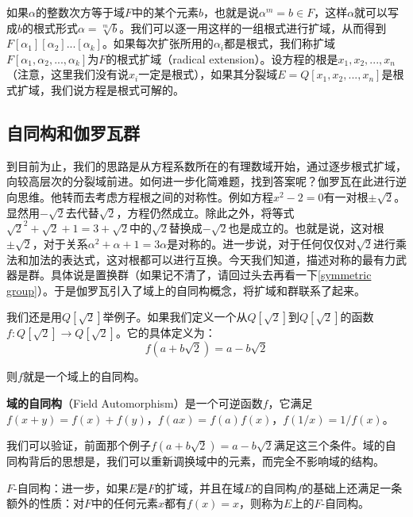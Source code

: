 \documentclass{article}
\begin{document}
如果$\alpha$的整数次方等于域$F$中的某个元素$b$，也就是说$\alpha^m = b \in F$，这样$\alpha$就可以写成$b$的根式形式$\alpha = \sqrt[m]{b}$。我们可以逐一用这样的一组根式进行扩域，从而得到$F[\alpha_1][\alpha_2]...[\alpha_k]$。如果每次扩张所用的$\alpha_i$都是根式，我们称扩域$F[\alpha_1, \alpha_2, ..., \alpha_k]$为$F$的根式扩域（radical extension）。设方程的根是$x_1, x_2, ..., x_n$（注意，这里我们没有说$x_i$一定是根式），如果其分裂域$E = Q[x_1, x_2, ..., x_n]$是根式扩域，我们说方程是根式可解的。

\begin{Exercise}
\end{Exercise}

\subsection{自同构和伽罗瓦群}

到目前为止，我们的思路是从方程系数所在的有理数域开始，通过逐步根式扩域，向较高层次的分裂域前进。如何进一步化简难题，找到答案呢？伽罗瓦在此进行逆向思维。他转而去考虑方程根之间的对称性。例如方程$x^2 - 2 = 0$有一对根$\pm \sqrt{2}$。显然用$-\sqrt{2}$去代替$\sqrt{2}$，方程仍然成立。除此之外，将等式$\sqrt{2}^2 + \sqrt{2} + 1 = 3 + \sqrt{2}$中的$\sqrt{2}$替换成$-\sqrt{2}$也是成立的。也就是说，这对根$\pm \sqrt{2}$，对于关系$\alpha^2 + \alpha + 1 = 3\alpha$是对称的。进一步说，对于任何仅仅对$\sqrt{2}$进行乘法和加法的表达式，这对根都可以进行互换。今天我们知道，描述对称的最有力武器是群。具体说是置换群（如果记不清了，请回过头去再看一下\ref{symmetric group}）。于是伽罗瓦引入了域上的自同构概念，将扩域和群联系了起来。

我们还是用$Q[\sqrt{2}]$举例子。如果我们定义一个从$Q[\sqrt{2}]$到$Q[\sqrt{2}]$的函数$f: Q[\sqrt{2}] \to Q[\sqrt{2}]$。它的具体定义为：
\[
f(a + b \sqrt{2}) = a - b \sqrt{2}
\]

则$f$就是一个域上的自同构。

\begin{definition}
\textbf{域的自同构}（Field Automorphism）是一个可逆函数$f$，它满足$f(x + y) = f(x) + f(y)$，$f(ax) = f(a) f(x)$，$f(1/x) = 1/f(x)$。
\end{definition}

我们可以验证，前面那个例子$f(a + b \sqrt{2}) = a - b \sqrt{2}$满足这三个条件。域的自同构背后的思想是，我们可以重新调换域中的元素，而完全不影响域的结构。

\begin{definition}
$F$-自同构：进一步，如果$E$是$F$的扩域，并且在域$E$的自同构$f$的基础上还满足一条额外的性质：对$F$中的任何元素$x$都有$f(x) = x$，则称为$E$上的$F$-自同构。
\end{definition}
\end{document}
